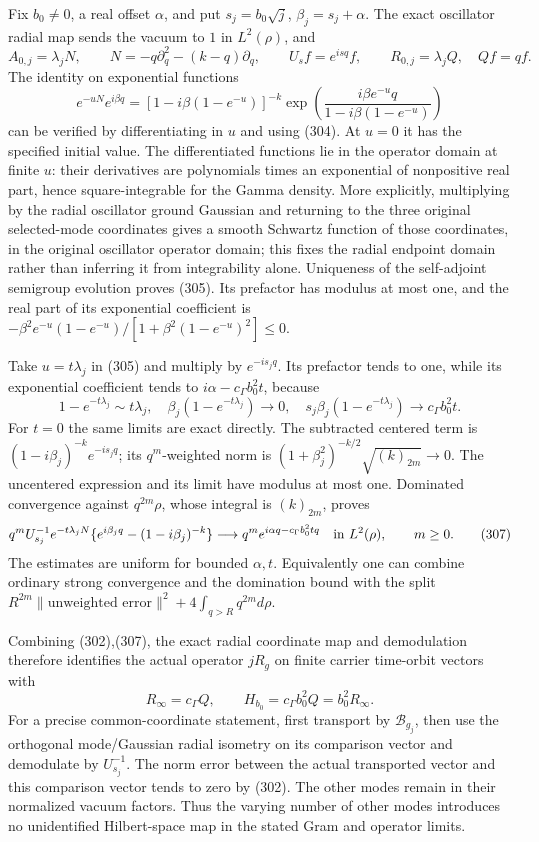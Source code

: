 \documentclass[
  11pt,
]{article}
\begin{document}
Fix \(b_0\ne0\), a real offset \(\alpha\), and put \(s_j=b_0\sqrt j\),
\(\beta_j=s_j+\alpha\). The exact oscillator radial map sends the vacuum
to \(1\) in \(L^2(\rho)\), and \[
 A_{0,j}=\lambda_jN,\qquad
 N=-q\partial_q^2-(k-q)\partial_q,\qquad
 U_s f=e^{isq}f,\qquad R_{0,j}=\lambda_jQ,\quad Qf=qf.
 \tag{304}
\] The identity on exponential functions \[
 e^{-uN}e^{i\beta q}
 =[1-i\beta(1-e^{-u})]^{-k}
  \exp\left(\frac{i\beta e^{-u}q}
                  {1-i\beta(1-e^{-u})}\right)
 \tag{305}
\] can be verified by differentiating in \(u\) and using (304). At
\(u=0\) it has the specified initial value. The differentiated functions
lie in the operator domain at finite \(u\): their derivatives are
polynomials times an exponential of nonpositive real part, hence
square-integrable for the Gamma density. More explicitly, multiplying by
the radial oscillator ground Gaussian and returning to the three
original selected-mode coordinates gives a smooth Schwartz function of
those coordinates, in the original oscillator operator domain; this
fixes the radial endpoint domain rather than inferring it from
integrability alone. Uniqueness of the self-adjoint semigroup evolution
proves (305). Its prefactor has modulus at most one, and the real part
of its exponential coefficient is \(-\beta^2e^{-u}(1-e^{-u})/
[1+\beta^2(1-e^{-u})^2]\le0\).

Take \(u=t\lambda_j\) in (305) and multiply by \(e^{-is_jq}\). Its
prefactor tends to one, while its exponential coefficient tends to
\(i\alpha-c_\Gamma b_0^2t\), because \[
 1-e^{-t\lambda_j}\sim t\lambda_j,\quad
 \beta_j(1-e^{-t\lambda_j})\to0,\quad
 s_j\beta_j(1-e^{-t\lambda_j})\to c_\Gamma b_0^2t.
 \tag{306}
\] For \(t=0\) the same limits are exact directly. The subtracted
centered term is \((1-i\beta_j)^{-k}e^{-is_jq}\); its \(q^m\)-weighted
norm is \((1+\beta_j^2)^{-k/2}\sqrt{(k)_{2m}}\to0\). The uncentered
expression and its limit have modulus at most one. Dominated convergence
against \(q^{2m}\rho\), whose integral is \((k)_{2m}\), proves \[
 q^m U_{s_j}^{-1}e^{-t\lambda_jN}
       \{e^{i\beta_jq}-(1-i\beta_j)^{-k}\}
 \longrightarrow q^m e^{i\alpha q-c_\Gamma b_0^2tq}
 \quad\hbox{in }L^2(\rho),\qquad m\ge0.
 \tag{307}
\] The estimates are uniform for bounded \(\alpha,t\). Equivalently one
can combine ordinary strong convergence and the domination bound with
the split \(R^{2m}\|\text{unweighted error}\|^2
+4\int_{q>R}q^{2m}d\rho\).

Combining (302),(307), the exact radial coordinate map and demodulation
therefore identifies the actual operator \(jR_g\) on finite carrier
time-orbit vectors with \[
 R_\infty=c_\Gamma Q,\qquad
 H_{b_0}=c_\Gamma b_0^2Q=b_0^2R_\infty .
 \tag{308}
\] For a precise common-coordinate statement, first transport by
\(\mathcal B_{g_j}\), then use the orthogonal mode/Gaussian radial
isometry on its comparison vector and demodulate by \(U_{s_j}^{-1}\).
The norm error between the actual transported vector and this comparison
vector tends to zero by (302). The other modes remain in their
normalized vacuum factors. Thus the varying number of other modes
introduces no unidentified Hilbert-space map in the stated Gram and
operator limits.
\end{document}
